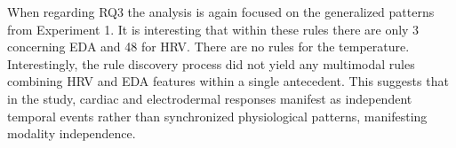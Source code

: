 \documentclass{isd}
\begin{document}
{%



When regarding RQ3 the analysis is again focused on the generalized patterns from Experiment 1. It is interesting that within these rules there are only 3 concerning EDA and 48 for HRV. There are no rules for the temperature. Interestingly, the rule discovery process did not yield any multimodal rules combining HRV and EDA features within a single antecedent. This suggests that in the study, cardiac and electrodermal responses manifest as independent temporal events rather than synchronized physiological patterns, manifesting modality independence.


}
\end{document}

